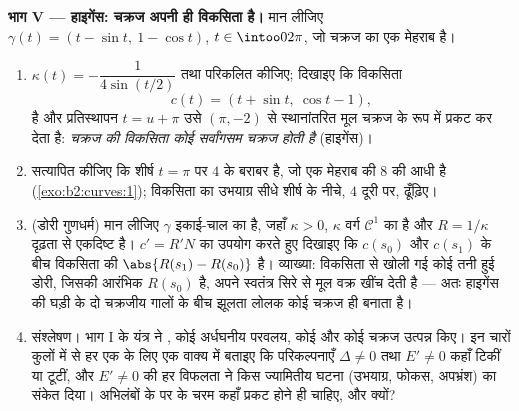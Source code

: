 \begin{problem}[{सप्ताहांत समस्या --- अन्वालोप यंत्र और
चार शास्त्रीय वक्र}]
\medskip
\noindent\textbf{भाग V --- हाइगेंस: चक्रज अपनी ही
विकसिता है।} मान लीजिए $\gamma(t) = (t - \sin t,\ 1 - \cos t)$, $t \in
\intoo0{2\pi}$, जो चक्रज का एक मेहराब है।
\begin{enumerate}[resume]
  \item $\kappa(t) = -\dfrac1{4\sin(t/2)}$ तथा 
        परिकलित कीजिए; दिखाइए कि विकसिता
        \[
        c(t) = (t + \sin t,\ \cos t - 1),
        \]
        है और प्रतिस्थापन $t = u + \pi$ उसे $(\pi, -2)$ से
        स्थानांतरित मूल चक्रज के रूप में प्रकट कर देता है:
        \emph{चक्रज की विकसिता कोई सर्वांगसम चक्रज होती है}
        (हाइगेंस)।
  \item सत्यापित कीजिए कि शीर्ष $t =
        \pi$ पर  $4$ के बराबर है, जो एक मेहराब की  $8$ की
        आधी है (\cref{exo:b2:curves:1}); विकसिता का उभयाग्र सीधे
        शीर्ष के नीचे, $4$ दूरी पर, ढूँढ़िए।
  \item (डोरी गुणधर्म) मान लीजिए $\gamma$ इकाई-चाल का है, जहाँ
        $\kappa > 0$, $\kappa$ वर्ग $\mathcal C^1$ का है और
        $R = 1/\kappa$ दृढ़ता से एकदिष्ट है। $c' = R'N$ का उपयोग करते हुए
        दिखाइए कि $c(s_0)$ और $c(s_1)$ के बीच विकसिता की 
        $\abs{R(s_1) - R(s_0)}$ है।
        व्याख्या: विकसिता से खोली गई कोई तनी हुई डोरी, जिसकी
        आरंभिक  $R(s_0)$ है, अपने स्वतंत्र सिरे से मूल वक्र
        खींच देती है --- अतः हाइगेंस की घड़ी के दो चक्रजीय गालों
        के बीच झूलता लोलक कोई चक्रज ही बनाता है।
  \item संश्लेषण। भाग I के यंत्र ने , कोई अर्धघनीय
        परवलय, कोई  और कोई चक्रज उत्पन्न किए। इन चारों
        कुलों में से हर एक के लिए एक वाक्य में बताइए कि
        परिकल्पनाएँ $\Delta \neq 0$ तथा $E' \neq 0$ कहाँ टिकीं या टूटीं, और
        $E' \neq 0$ की हर विफलता ने किस ज्यामितीय घटना (उभयाग्र,
        फोकस, अपभ्रंश) का संकेत दिया। अभिलंबों के  पर
         के चरम कहाँ प्रकट होने ही चाहिए, और क्यों?
\end{enumerate}
\end{problem}

